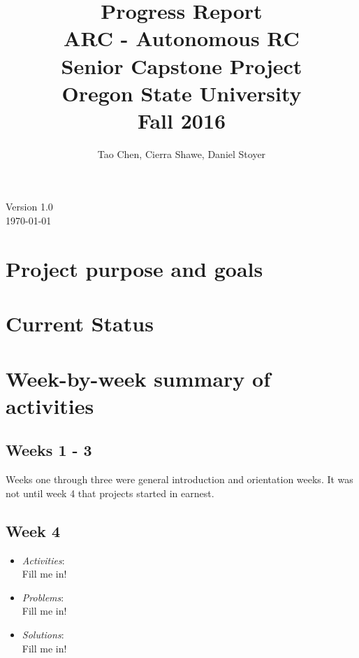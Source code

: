 \documentclass[compsoc,draftclsnofoot,onecolumn,10pt]{IEEEtran}
\date{}
\begin{document}
\begin{titlepage}
\title{
Progress Report\\
\LARGE
ARC - Autonomous RC\\
Senior Capstone Project\\
Oregon State University\\
Fall 2016
}
\author{Tao Chen, Cierra Shawe, Daniel Stoyer}
\maketitle
\begin{center}
	Version 1.0\\
	\today
\end{center}

\thispagestyle{empty} %
	
\end{titlepage}

\tableofcontents

\newpage

\section{Project purpose and goals} 

\section{Current Status}

\section{Week-by-week summary of activities}

\subsection{Weeks 1 - 3}
Weeks one through three were general introduction and orientation weeks. It was
not until week 4 that projects started in earnest.

\subsection{Week 4}
	\begin{itemize}
        \item \textit{Activities}:\\
        Fill me in!
        \item \textit{Problems}:\\
        Fill me in!
        \item \textit{Solutions}:\\
        Fill me in!
	\end{itemize}
   
\end{document}
